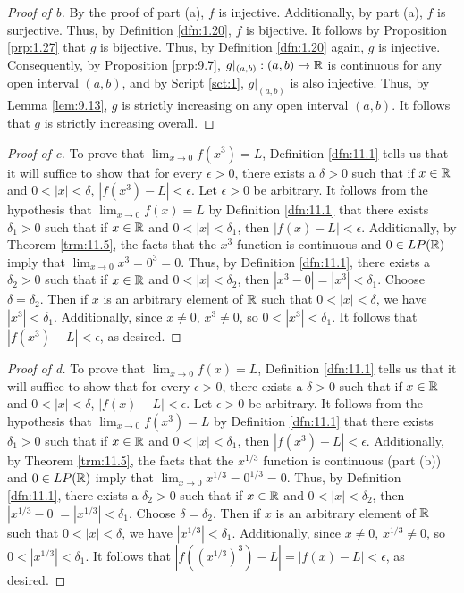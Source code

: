 \documentclass[../main.tex]{subfiles}
\begin{document}
\begin{enumerate}
\begin{proof}[Proof of b]
        By the proof of part (a), $f$ is injective. Additionally, by part (a), $f$ is surjective. Thus, by Definition \ref{dfn:1.20}, $f$ is bijective. It follows by Proposition \ref{prp:1.27} that $g$ is bijective. Thus, by Definition \ref{dfn:1.20} again, $g$ is injective. Consequently, by Proposition \ref{prp:9.7}, $g|_{(a,b)}:(a,b)\to\mathbb{R}$ is continuous for any open interval $(a,b)$, and by Script \ref{sct:1}, $g|_{(a,b)}$ is also injective. Thus, by Lemma \ref{lem:9.13}, $g$ is strictly increasing on any open interval $(a,b)$. It follows that $g$ is strictly increasing overall.
    \end{proof}
    \begin{proof}[Proof of c]
        To prove that $\lim_{x\to 0}f(x^3)=L$, Definition \ref{dfn:11.1} tells us that it will suffice to show that for every $\epsilon>0$, there exists a $\delta>0$ such that if $x\in\mathbb{R}$ and $0<|x|<\delta$, $|f(x^3)-L|<\epsilon$. Let $\epsilon>0$ be arbitrary. It follows from the hypothesis that $\lim_{x\to 0}f(x)=L$ by Definition \ref{dfn:11.1} that there exists $\delta_1>0$ such that if $x\in\mathbb{R}$ and $0<|x|<\delta_1$, then $|f(x)-L|<\epsilon$. Additionally, by Theorem \ref{trm:11.5}, the facts that the $x^3$ function is continuous and $0\in LP(\mathbb{R})$ imply that $\lim_{x\to 0}x^3=0^3=0$. Thus, by Definition \ref{dfn:11.1}, there exists a $\delta_2>0$ such that if $x\in\mathbb{R}$ and $0<|x|<\delta_2$, then $|x^3-0|=|x^3|<\delta_1$. Choose $\delta=\delta_2$. Then if $x$ is an arbitrary element of $\mathbb{R}$ such that $0<|x|<\delta$, we have $|x^3|<\delta_1$. Additionally, since $x\neq 0$, $x^3\neq 0$, so $0<|x^3|<\delta_1$. It follows that $|f(x^3)-L|<\epsilon$, as desired.
    \end{proof}
    \begin{proof}[Proof of d]
        To prove that $\lim_{x\to 0}f(x)=L$, Definition \ref{dfn:11.1} tells us that it will suffice to show that for every $\epsilon>0$, there exists a $\delta>0$ such that if $x\in\mathbb{R}$ and $0<|x|<\delta$, $|f(x)-L|<\epsilon$. Let $\epsilon>0$ be arbitrary. It follows from the hypothesis that $\lim_{x\to 0}f(x^3)=L$ by Definition \ref{dfn:11.1} that there exists $\delta_1>0$ such that if $x\in\mathbb{R}$ and $0<|x|<\delta_1$, then $|f(x^3)-L|<\epsilon$. Additionally, by Theorem \ref{trm:11.5}, the facts that the $x^{1/3}$ function is continuous (part (b)) and $0\in LP(\mathbb{R})$ imply that $\lim_{x\to 0}x^{1/3}=0^{1/3}=0$. Thus, by Definition \ref{dfn:11.1}, there exists a $\delta_2>0$ such that if $x\in\mathbb{R}$ and $0<|x|<\delta_2$, then $|x^{1/3}-0|=|x^{1/3}|<\delta_1$. Choose $\delta=\delta_2$. Then if $x$ is an arbitrary element of $\mathbb{R}$ such that $0<|x|<\delta$, we have $|x^{1/3}|<\delta_1$. Additionally, since $x\neq 0$, $x^{1/3}\neq 0$, so $0<|x^{1/3}|<\delta_1$. It follows that $|f((x^{1/3})^3)-L|=|f(x)-L|<\epsilon$, as desired.

\end{proof}
\end{enumerate}
\end{document}
